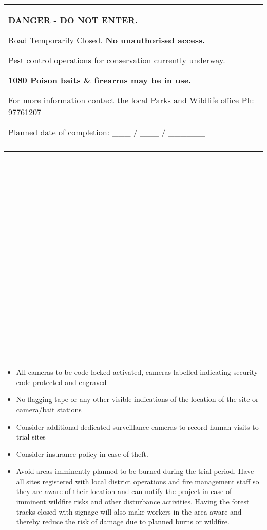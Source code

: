 \documentclass[version=last,
    paper=a4,                               %
    10pt,                                   %
    dvipsnames,
    oneside,                              %
    headings=openany,                       %
    open=any,
    BCOR=7mm,                               %
    DIV=15,     %
]{scrbook}
\begin{document}
\begin{longtable}[c]{@{}l@{}}
\toprule\addlinespace
\begin{minipage}[t]{0.97\columnwidth}\raggedright
\textbf{DANGER - DO NOT ENTER.}

Road Temporarily Closed. \textbf{No unauthorised access}\textbf{.}

Pest control operations for conservation currently underway.

\textbf{1080 Poison baits \& firearms may be in use}\textbf{.}

For more information contact the local Parks and Wildlife office Ph:
97761207

Planned date of completion: \_\_\_ / \_\_\_ / \_\_\_\_\_\_~~~~~~~~~~~~
\end{minipage}
\\\addlinespace
\bottomrule
\end{longtable}

~

~

~

~

~

~

~

~

~

~

~

~

\begin{itemize}
\itemsep1pt\parskip0pt
\item
  All cameras to be code locked activated, cameras labelled indicating
  security code protected and engraved
\item
  No flagging tape or any other visible indications of the location of
  the site or camera/bait stations
\end{itemize}

\begin{itemize}
\itemsep1pt\parskip0pt
\item
  Consider additional dedicated surveillance cameras to record human
  visits to trial sites
\item
  Consider insurance policy in case of theft.
\item
  Avoid areas imminently planned to be burned during the trial period.
  Have all sites registered with local district operations and fire
  management staff so they are aware of their location and can notify
  the project in case of imminent wildfire risks and other disturbance
  activities. Having the forest tracks closed with signage will also
  make workers in the area aware and thereby reduce the risk of damage
  due to planned burns or wildfire.
\end{itemize}
\end{document}

